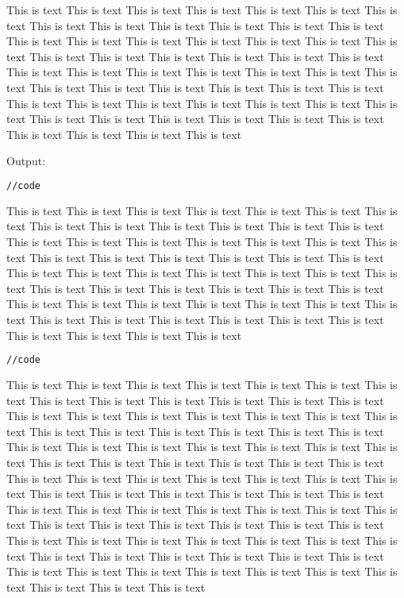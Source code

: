 \documentclass[a4paper]{uestcreport}
\begin{document}
This is text This is text This is text This is text This is text This is text This is text This is text This is text This is text This is text This is text This is text This is text This is text This is text This is text This is text This is text This is text This is text This is text This is text This is text This is text This is text This is text This is text This is text This is text This is text This is text This is text This is text This is text This is text This is text This is text This is text This is text This is text This is text This is text This is text This is text This is text This is text This is text This is text This is text This is text This is text This is text This is text This is text This is text 

Output:
\begin{lstlisting}[language=sh]
//code
\end{lstlisting}

This is text This is text This is text This is text This is text This is text This is text This is text This is text This is text This is text This is text This is text This is text This is text This is text This is text This is text This is text This is text This is text This is text This is text This is text This is text This is text This is text This is text This is text This is text This is text This is text This is text This is text This is text This is text This is text This is text This is text This is text This is text This is text This is text This is text This is text This is text This is text This is text This is text This is text This is text This is text This is text This is text This is text This is text 
\begin{lstlisting}[language=sh]
//code
\end{lstlisting}

This is text This is text This is text This is text This is text This is text This is text This is text This is text This is text This is text This is text This is text This is text This is text This is text This is text This is text This is text This is text This is text This is text This is text This is text This is text This is text This is text This is text This is text This is text This is text This is text This is text This is text This is text This is text This is text This is text This is text This is text This is text This is text This is text This is text This is text This is text This is text This is text This is text This is text This is text This is text This is text This is text This is text This is text This is text This is text This is text This is text This is text This is text This is text This is text This is text This is text This is text This is text This is text This is text This is text This is text This is text This is text This is text This is text This is text This is text This is text This is text This is text This is text This is text This is text This is text This is text This is text This is text 
\end{document}

